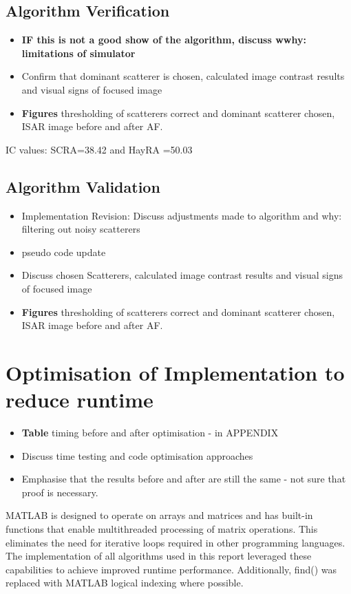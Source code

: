 \documentclass[class=report,11pt,crop=false]{standalone}
\begin{document}
    \subsection{Algorithm Verification}
    \begin{itemize}
        \item \textbf{IF this is not a good show of the algorithm, discuss wwhy: limitations of simulator}
        \item Confirm that dominant scatterer is chosen, calculated image contrast results and visual signs of focused image
        \item \textbf{Figures} thresholding of scatterers correct and dominant scatterer chosen, ISAR image before and after AF.
    \end{itemize}

    IC values: SCRA=38.42  and HayRA =50.03 
    
    \subsection{Algorithm Validation}
    \begin{itemize}
        \item Implementation Revision: Discuss adjustments made to algorithm and why: filtering out noisy scatterers
        \item pseudo code update
        \item Discuss chosen Scatterers, calculated image contrast results and visual signs of focused image
        \item \textbf{Figures} thresholding of scatterers correct and dominant scatterer chosen, ISAR image before and after AF.
    \end{itemize}
\section{Optimisation of Implementation to reduce runtime \label{sec:V&V_optimisation}}
\begin{itemize}
    \item \textbf{Table} timing before and after optimisation - in APPENDIX
    \item Discuss time testing and code optimisation approaches
    \item Emphasise that the results before and after are still the same - not sure that proof is necessary.
\end{itemize}
\textsc{MATLAB} is designed to operate on arrays and matrices and has built-in functions that enable multithreaded processing of matrix operations. This eliminates the need for iterative loops required in other programming languages. The implementation of all algorithms used in this report leveraged these capabilities to achieve improved runtime performance.  Additionally, find() was replaced with \textsc{MATLAB} logical indexing \cite{matlab_logical_indexing} where possible. 
\end{document}

